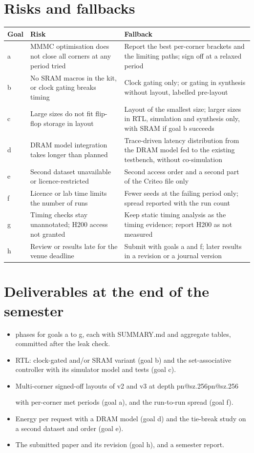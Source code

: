 \documentclass[11pt,a4paper]{article}
\makeatletter
\newcommand{\R}[1]{\ifcsname pn@#1\endcsname\csname pn@#1\endcsname\else
  \PackageError{plan}{number key '#1' is not defined in paper/v2/macros.tex}{}\fi}
\makeatother
\begin{document}
\section{Risks and fallbacks}
\begin{center}
\small
\begin{tabularx}{\textwidth}{@{}l>{\raggedright\arraybackslash}p{}L@{}}
\toprule
Goal & Risk & Fallback \\
\midrule
a & MMMC optimisation does not close all corners at any period tried & Report the best per-corner brackets and the
limiting paths; sign off at a relaxed period \\
b & No SRAM macros in the kit, or clock gating breaks timing & Clock gating only; or gating in synthesis without
layout, labelled pre-layout \\
c & Large sizes do not fit flip-flop storage in layout & Layout of the smallest size; larger sizes in RTL, simulation
and synthesis only, with SRAM if goal b succeeds \\
d & DRAM model integration takes longer than planned & Trace-driven latency distribution from the DRAM model fed to
the existing testbench, without co-simulation \\
e & Second dataset unavailable or licence-restricted & Second access order and a second part of the Criteo file only
\\
f & Licence or lab time limits the number of runs & Fewer seeds at the failing period only; spread reported with the
run count \\
g & Timing checks stay unannotated; H200 access not granted & Keep static timing analysis as the timing evidence;
report H200 as not measured \\
h & Review or results late for the venue deadline & Submit with goals a and f; later results in a revision or a
journal version \\
\bottomrule
\end{tabularx}
\end{center}

\section{Deliverables at the end of the semester}
\begin{itemize}
\item {} phases for goals a to g, each with SUMMARY.md and aggregate tables, committed after the leak
check.
\item RTL: clock-gated and/or SRAM variant (goal b) and the set-associative controller with its simulator model and
tests (goal c).
\item Multi-corner signed-off layouts of v2 and v3 at depth \R{sz.256} with per-corner met periods (goal a), and the
run-to-run spread (goal f).
\item Energy per request with a DRAM model (goal d) and the tie-break study on a second dataset and order (goal e).
\item The submitted paper and its revision (goal h), and a semester report.
\end{itemize}
\end{document}
